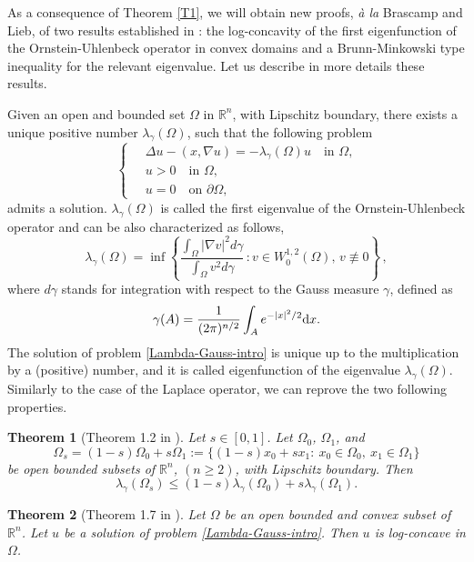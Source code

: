 \documentclass[12pt]{amsart}
\newtheorem{theorem}{Theorem}[section]
\newcommand{\R}{\mathbb R}
\newcommand{\1}{\mathbf 1}
\renewcommand{\d}{\mbox{\rm d}}
\begin{document}
As a consequence of Theorem \ref{T1}, we will obtain new proofs, {\it \`a la} Brascamp and Lieb, of two results established in \cite{CFLS24}: the log-concavity of the first eigenfunction of the Ornstein-Uhlenbeck operator in convex domains and a Brunn-Minkowski type inequality for the relevant eigenvalue. %
Let us describe in more details these results.

Given an open and bounded set $\Omega$ in $\R^n$, with Lipschitz boundary, there exists a unique positive number $\lambda_\gamma(\Omega)$, such that the following problem
\begin{equation}\label{Lambda-Gauss-intro}
\left\{
\begin{aligned}
&\Delta u-(x,\nabla u)=-\lambda_\gamma(\Omega) u\quad\mbox{in $\Omega$,}\\\
& u>0\quad\mbox{in $\Omega$,}\\
& u=0\quad\mbox{on $\partial \Omega$},
\end{aligned}
\right.
\end{equation}
admits a solution. $\lambda_\gamma(\Omega)$ is called the first eigenvalue of the Ornstein-Uhlenbeck operator and can be also characterized as follows,
$$
\lambda_\gamma(\Omega)=\inf\left\{\frac{\int_\Omega |\nabla v|^2d\gamma}{\int_\Omega v^2d\gamma}\,: v\in W_0^{1,2}(\Omega),\, v\not\equiv 0\right\}\,,
$$
where $d\gamma$ stands for integration with respect to the Gauss measure $\gamma$, defined as
$$
\gamma(A)=\frac1{(2\pi)^{n/2}}\int_A e^{-|x|^2/2}\d x.
$$
The solution of problem \eqref{Lambda-Gauss-intro} is unique up to the multiplication by a (positive) number, and it is called eigenfunction of the eigenvalue $\lambda_\gamma(\Omega)$.
Similarly to the case of the Laplace operator, we can reprove the two following properties.

\begin{theorem}[Theorem 1.2 in \cite{CFLS24}]\label{Application2} Let $s\in [0,1]$. Let $\Omega_0$, $\Omega_1$, and
\[
\Omega_s=(1-s)\Omega_0+s\Omega_1:=\{(1-s)x_0+sx_1:\ x_0\in \Omega_0,\ x_1\in \Omega_1\}
\]
be open bounded subsets of $\R^n$, $(n\geq 2)$, with Lipschitz boundary. Then
\[
\lambda_\gamma(\Omega_s)\leq (1-s)\lambda_\gamma(\Omega_0)+s\lambda_\gamma(\Omega_1).
\]
\end{theorem}

\begin{theorem}[Theorem 1.7 in \cite{CFLS24}]\label{Application1}
Let $\Omega$ be an open bounded and convex subset of $\R^n$. Let $u$ be a solution of problem \eqref{Lambda-Gauss-intro}. Then $u$ is log-concave in $\Omega$.
\end{theorem}
\end{document}
